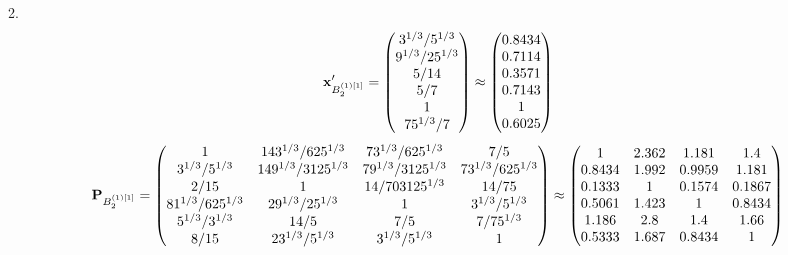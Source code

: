 \documentclass[10pt,a4paper]{article}
\begin{document}
	2.
	\[
		\bold{x}'_{B_2^{(1)[1]}} = 
		\begin{pmatrix}
			{{3^ {1 / 3}}} / {{5^ {1 / 3}}} \\
			{{9^ {1 / 3}}} / {{25^ {1 / 3}}} \\
			{{5}} / {{14}} \\
			{{5}} / {{7}} \\
			{1}{} \\
			{{75^ {1 / 3}}} / {{7}} \\
		\end{pmatrix}
		\approx
		\begin{pmatrix}
			0.8434   \\
			0.7114   \\
			0.3571   \\
			0.7143   \\
			1        \\
			0.6025   \\
		\end{pmatrix}
	\]
	\[
		\bold{P}_{B_2^{(1)[1]}} = 
		\begin{pmatrix}
			{1}{} & {{14}{3^ {1 / 3}}} / {{625^ {1 / 3}}} & {{7}{3^ {1 / 3}}} / {{625^ {1 / 3}}} & {{7}} / {{5}} \\
			{{3^ {1 / 3}}} / {{5^ {1 / 3}}} & {{14}{9^ {1 / 3}}} / {{3125^ {1 / 3}}} & {{7}{9^ {1 / 3}}} / {{3125^ {1 / 3}}} & {{7}{3^ {1 / 3}}} / {{625^ {1 / 3}}} \\
			{{2}} / {{15}} & {1}{} & {{14}} / {{703125^ {1 / 3}}} & {{14}} / {{75}} \\
			{{81^ {1 / 3}}} / {{625^ {1 / 3}}} & {{2}{9^ {1 / 3}}} / {{25^ {1 / 3}}} & {1}{} & {{3^ {1 / 3}}} / {{5^ {1 / 3}}} \\
			{{5^ {1 / 3}}} / {{3^ {1 / 3}}} & {{14}} / {{5}} & {{7}} / {{5}} & {{7}} / {{75^ {1 / 3}}} \\
			{{8}} / {{15}} & {{2}{3^ {1 / 3}}} / {{5^ {1 / 3}}} & {{3^ {1 / 3}}} / {{5^ {1 / 3}}} & {1}{} \\
		\end{pmatrix}
		\approx
		\begin{pmatrix}
			1        & 2.362    & 1.181    & 1.4      \\
			0.8434   & 1.992    & 0.9959   & 1.181    \\
			0.1333   & 1        & 0.1574   & 0.1867   \\
			0.5061   & 1.423    & 1        & 0.8434   \\
			1.186    & 2.8      & 1.4      & 1.66     \\
			0.5333   & 1.687    & 0.8434   & 1        \\
		\end{pmatrix}
	\]
\end{document}
